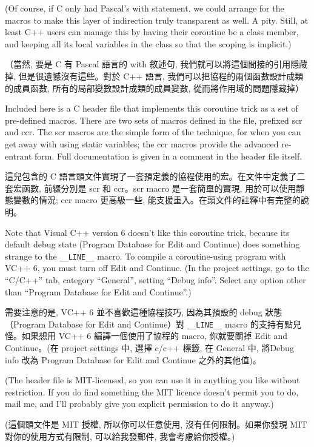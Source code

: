 \documentclass[12pt]{article}
\begin{document}
\begin{CJK}{UTF8}{bsmi}
(Of course, if C only had Pascal's with statement, we could arrange for the macros to make this layer of indirection truly transparent as well. A pity. Still, at least C++ users can manage this by having their coroutine be a class member, and keeping all its local variables in the class so that the scoping is implicit.)

（當然, 要是 C 有 Pascal 語言的 with 敘述句, 我們就可以將這個間接的引用隱藏掉, 但是很遺憾沒有這些。對於 C++
語言, 我們可以把協程的兩個函數設計成類的成員函數, 所有的局部變數設計成類的成員變數, 從而將作用域的問題隱藏掉） 

Included here is a C header file that implements this coroutine trick as a set of pre-defined macros. There are two sets of macros defined in the file, prefixed scr and ccr. The scr macros are the simple form of the technique, for when you can get away with using static variables; the ccr macros provide the advanced re-entrant form. Full documentation is given in a comment in the header file itself.

這兒包含的 C 語言頭文件實現了一套預定義的協程使用的宏。在文件中定義了二套宏函數, 前綴分別是 scr 和 ccr。scr macro 是一套簡單的實現, 用於可以使用靜態變數的情況; ccr macro 更高級一些, 能支援重入。在頭文件的註釋中有完整的說明。 

Note that Visual C++ version 6 doesn't like this coroutine trick, because its default debug state (Program Database for Edit and Continue) does something strange to the
\verb+__LINE__+ macro. To compile a coroutine-using program with VC++ 6, you must turn off Edit and Continue. (In the project settings, go to the ``C/C++'' tab, category ``General'', setting ``Debug info''. Select any option other than ``Program Database for Edit and Continue''.)

需要注意的是, VC++ 6 並不喜歡這種協程技巧, 因為其預設的 debug 狀態（Program Database for Edit and Continue）對 \verb+__LINE__+ macro
的支持有點兒怪。如果想用 VC++ 6 編譯一個使用了協程的 macro, 你就要關掉 Edit and Continue。(在 project settings 中, 選擇 c/c++ 標籤,
在 General 中, 將Debug info 改為 Program Database for Edit and Continue 之外的其他值)。 

(The header file is MIT-licensed, so you can use it in anything you like without restriction. If you do find something the MIT licence doesn't permit you to do, mail me, and I'll probably give you explicit permission to do it anyway.)

(這個頭文件是 MIT 授權, 所以你可以任意使用, 沒有任何限制。如果你發現 MIT 對你的使用方式有限制, 可以給我發郵件, 我會考慮給你授權。)


\end{CJK}
\end{document}
